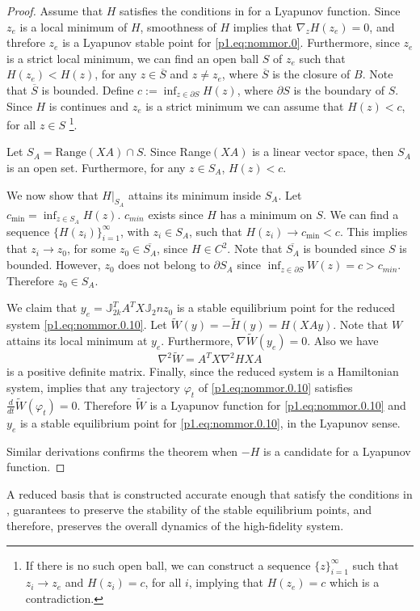 {\begin{proof}
Assume that $H$ satisfies the conditions in  for a Lyapunov function. Since $z_e$ is a local minimum of $H$, smoothness of $H$ implies that $\nabla_z H(z_e) = 0$, and threfore $z_e$ is a Lyapunov stable point for \eqref{p1.eq:nommor.0}. Furthermore, since $z_e$ is a strict local minimum, we can find an open ball $S$ of $z_e$ such that $H(z_e)< H(z)$, for any $z \in \overline S$ and $z\neq z_e$, where $\overline S$ is the closure of $B$. Note that $\overline S$ is bounded. Define $c := \inf_{z\in \partial S} H(z)$, where $\partial S$ is the boundary of $S$. Since $H$ is continues and $z_e$ is a strict minimum we can assume that $H(z)<c$, for all $z\in S$ \footnote{If there is no such open ball, we can construct a sequence $\{z\}_{i=1}^\infty$ such that $z_i\to z_e$ and $H(z_i) = c$, for all $i$, implying that $H(z_e) = c$ which is a contradiction.}.

Let $S_A = \text{Range}(XA)\cap S$. Since Range$(XA)$ is a linear vector space, then $S_A$ is an open set. Furthermore, for any $z\in S_A$, $H(z) < c$. 
		
We now show that $H|_{S_A}$ attains its minimum inside $S_A$. Let $c_{\text{min}} = \inf_{z\in S_A} H(z)$. $c_{min}$ exists since $H$ has a minimum on $S$. We can find a sequence $\{ H(z_i) \}_{i=1}^\infty$, with $z_i\in S_A$, such that $H(z_i)\to c_{\text{min}} < c$. This implies that $z_i\to z_0$, for some $z_0\in \overline {S_A}$, since $H\in C^2$. Note that $\overline {S_A}$ is bounded since $S$ is bounded. However, $z_0$ does not belong to $\partial S_A$ since $\inf_{z\in \partial S} W(z)=c > c_{min}$. Therefore $z_0 \in S_A$. 

We claim that $y_e = \mathbb J_{2k}^T A^T X \mathbb J_2n z_0$ is a stable equilibrium point for the reduced system \eqref{p1.eq:nommor.0.10}. Let $\tilde W(y) = - \tilde H(y) = H(XAy)$. Note that $W$ attains its local minimum at $y_e$. Furthermore, $\nabla \tilde W(y_e) = 0$. Also we have
\begin{equation}
	\nabla^2 \tilde W = A^T X \nabla^2 H X A
\end{equation}
is a positive definite matrix. Finally, since the reduced system is a Hamiltonian system,  implies that any trajectory $\varphi_t$ of \eqref{p1.eq:nommor.0.10} satisfies $\frac{d}{dt} \tilde W(\varphi_t) = 0$. Therefore $\tilde W$ is a Lyapunov function for \eqref{p1.eq:nommor.0.10} and $y_e$ is a stable equilibrium point for \eqref{p1.eq:nommor.0.10}, in the Lyapunov sense.

Similar derivations confirms the theorem when $-H$ is a candidate for a Lyapunov function.
\end{proof}

A reduced basis that is constructed accurate enough that satisfy the conditions in , guarantees to preserve the stability of the stable equilibrium points, and therefore, preserves the overall dynamics of the high-fidelity system.
}

